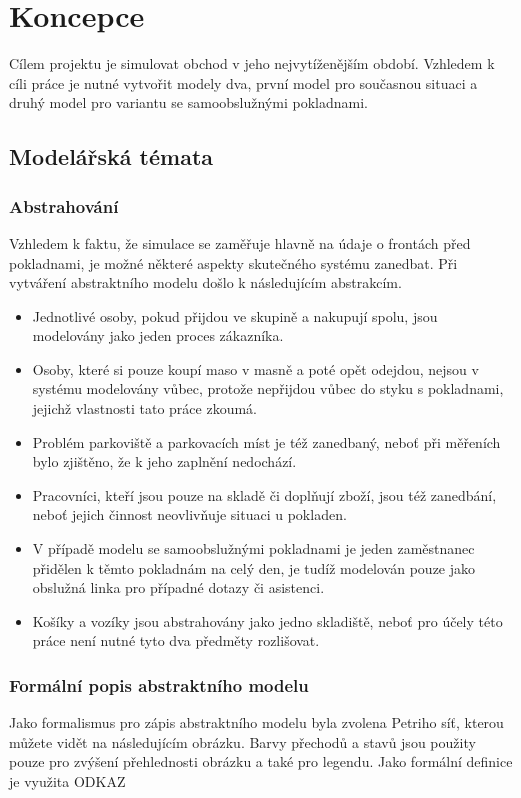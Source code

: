 \documentclass[12pt,a4paper,titlepage]{article}
\begin{document}
\section{Koncepce}
Cílem projektu je simulovat obchod v jeho nejvytíženějším období. Vzhledem k cíli práce je nutné vytvořit modely dva, první model pro současnou situaci a druhý model pro variantu se samoobslužnými pokladnami. 

\subsection{Modelářská témata}
\subsubsection{Abstrahování}
Vzhledem k faktu, že simulace se zaměřuje hlavně na údaje o frontách před pokladnami, je možné některé aspekty skutečného systému zanedbat. Při vytváření abstraktního modelu došlo k následujícím abstrakcím. 
\begin{itemize}
\item Jednotlivé osoby, pokud přijdou ve skupině a nakupují spolu, jsou modelovány jako jeden proces zákazníka.
\item Osoby, které si pouze koupí maso v masně a poté opět odejdou, nejsou v systému modelovány vůbec, protože nepřijdou vůbec do styku s pokladnami, jejichž vlastnosti tato práce zkoumá. 
\item Problém parkoviště a parkovacích míst je též zanedbaný, neboť při měřeních bylo zjištěno, že k jeho zaplnění nedochází.
\item Pracovníci, kteří jsou pouze na skladě či doplňují zboží, jsou též zanedbání, neboť jejich činnost neovlivňuje situaci u pokladen. 
\item V případě modelu se samoobslužnými pokladnami je jeden zaměstnanec přidělen k těmto pokladnám na celý den, je tudíž modelován pouze jako obslužná linka pro případné dotazy či asistenci.
\item Košíky a vozíky jsou abstrahovány jako jedno skladiště, neboť pro účely této práce není nutné tyto dva předměty rozlišovat.   
\end{itemize}


\subsubsection{Formální popis abstraktního modelu}
Jako formalismus pro zápis abstraktního modelu byla zvolena Petriho síť, kterou můžete vidět na následujícím obrázku. Barvy přechodů a stavů jsou použity pouze pro zvýšení přehlednosti obrázku a také pro legendu. Jako formální definice je využita ODKAZ  \\
\end{document}

